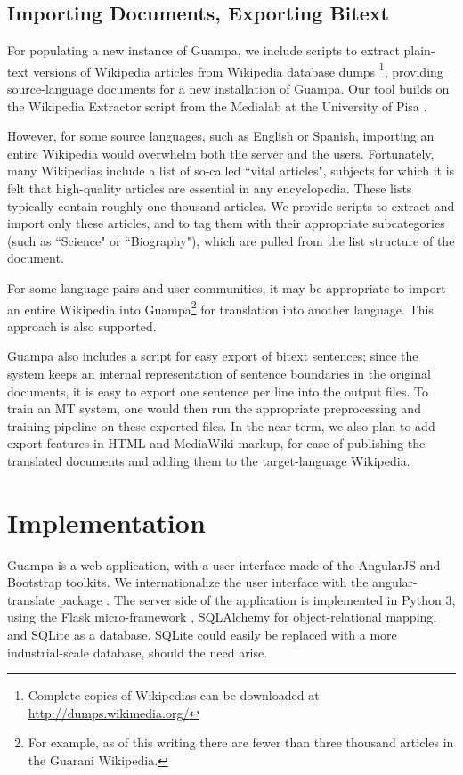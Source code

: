 \documentclass[10pt, a4paper]{article}
\begin{document}
\subsection{Importing Documents, Exporting Bitext}
For populating a new instance of Guampa, we include scripts to extract
plain-text versions of Wikipedia articles from Wikipedia database dumps
\footnote{Complete copies of Wikipedias can be downloaded at \\
\url{http://dumps.wikimedia.org/}}, providing source-language documents for a
new installation of Guampa. Our tool builds on the Wikipedia Extractor
script from the Medialab at the University of Pisa \cite{pisa-wp-extractor}.

However, for some source languages, such as English or Spanish, importing an
entire Wikipedia would overwhelm both the server and the users. Fortunately,
many Wikipedias include a list of so-called ``vital articles", subjects for
which it is felt that high-quality articles are essential in any encyclopedia.
These lists typically contain roughly one thousand articles. We provide scripts
to extract and import only these articles, and to tag them with their
appropriate subcategories (such as ``Science" or ``Biography"), which are pulled
from the list structure of the document.

For some language pairs and user communities, it may be appropriate to import
an entire Wikipedia into Guampa\footnote{
For example, as of this writing there are fewer than three thousand
articles in the Guarani Wikipedia.}
for translation into another language. This approach is also supported.

Guampa also includes a script for easy export of bitext sentences; since the
system keeps an internal representation of sentence boundaries in the original
documents, it is easy to export one sentence per line into the output files. To
train an MT system, one would then run the appropriate preprocessing and
training pipeline on these exported files. In the near term, we also plan to
add export features in HTML and MediaWiki markup, for ease of publishing the
translated documents and adding them to the target-language Wikipedia.

\section{Implementation}
Guampa is a web application, with a user interface made of the AngularJS
\cite{angularjs} and Bootstrap \cite{bootstrap} toolkits. We internationalize
the user interface with the angular-translate package \cite{angular-translate}.
The server side of the application is implemented in Python 3, using the Flask
micro-framework \cite{flask}, SQLAlchemy
\cite{sqlalchemy} for object-relational mapping, and SQLite \cite{sqlite} as a
database. SQLite could easily be replaced with a more industrial-scale
database, should the need arise.
\end{document}
